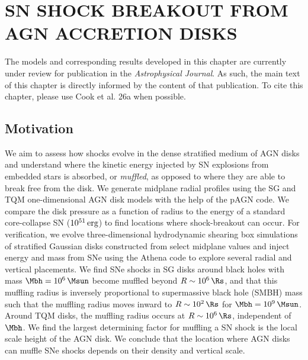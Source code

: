 \section{\texorpdfstring{\MakeUppercase{sn shock breakout from agn accretion disks}}{sn shock breakout from agn accretion disks}}
\label{sec:sn-hydrodynamics}


\par The models and corresponding results developed in this chapter are currently under review for publication in the \textit{Astrophysical Journal}.
As such, the main text of this chapter is directly informed by the content of that publication.
To cite this chapter, please use Cook et al. 26a when possible.

\subsection{Motivation}
\label{sec:motivation-ch3}
We aim to assess how shocks evolve in the dense stratified medium of AGN disks and understand where the kinetic energy injected by SN explosions from embedded stars is absorbed, or \emph{muffled}, as opposed to where they are able to break free from the disk.
We generate midplane radial profiles using the SG and TQM one-dimensional AGN disk models with the help of the pAGN code.
We compare the disk pressure as a function of radius to the energy of a standard core-collapse SN ($10^{51}\,{\rm erg}$) to find locations where shock-breakout can occur.
For verification, we evolve three-dimensional hydrodynamic shearing box simulations of stratified Gaussian disks constructed from select midplane values and inject energy and mass from SNe using the Athena code to explore several radial and vertical placements.
We find SNe shocks in SG disks around black holes with mass $\Mbh=10^6\,\Msun$ become muffled beyond $R\sim10^6\,\Rs$, and that this muffling radius is inversely proportional to supermassive black hole (SMBH) mass such that the muffling radius moves inward to $R\sim10^2\,\Rs$ for $\Mbh=10^9\,\Msun$.
Around TQM disks, the muffling radius occurs at $R\sim10^6\,\Rs$, independent of $\Mbh$.
We find the largest determining factor for muffling a SN shock is the local scale height of the AGN disk.
We conclude that the location where AGN disks can muffle SNe shocks depends on their density and vertical scale.



